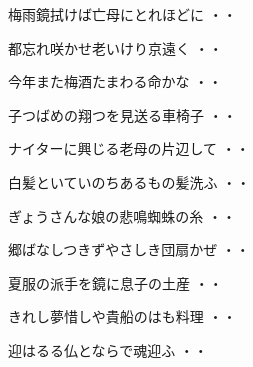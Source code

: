 \begin{shiika}梅雨鏡拭けば亡母にとれほどに
\hfill{・・}\end{shiika}
\vspace{0.6cm}
\begin{shiika}都忘れ咲かせ老いけり京遠く
\hfill{・・}\end{shiika}
\vspace{0.6cm}
\begin{shiika}今年また梅酒たまわる命かな
\hfill{・・}\end{shiika}
\vspace{0.6cm}
\begin{shiika}子つばめの翔つを見送る車椅子
\hfill{・・}\end{shiika}
\vspace{0.6cm}
\begin{shiika}ナイターに興じる老母の片辺して
\hfill{・・}\end{shiika}
\vspace{0.6cm}
\begin{shiika}白髪といていのちあるもの髪洗ふ
\hfill{・・}\end{shiika}
\vspace{0.6cm}
\begin{shiika}ぎょうさんな娘の悲鳴蜘蛛の糸
\hfill{・・}\end{shiika}
\vspace{0.6cm}
\begin{shiika}郷ばなしつきずやさしき団扇かぜ
\hfill{・・}\end{shiika}
\vspace{0.6cm}
\begin{shiika}夏服の派手を鏡に息子の土産
\hfill{・・}\end{shiika}
\vspace{0.6cm}
\begin{shiika}きれし夢惜しや貴船のはも料理
\hfill{・・}\end{shiika}
\vspace{0.6cm}
\begin{shiika}迎はるる仏とならで魂迎ふ
\hfill{・・}\end{shiika}
\vspace{0.6cm}

